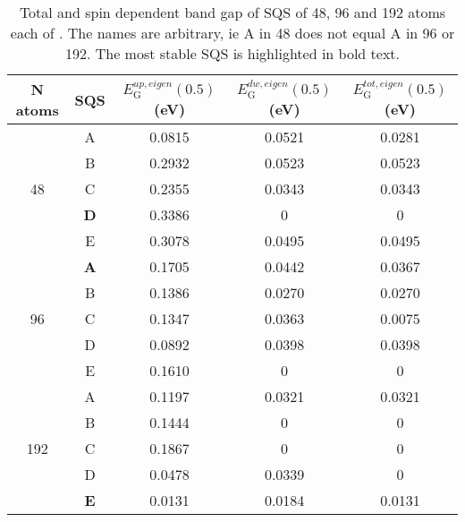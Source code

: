 \begin{table}[H]
\begin{tabular}{@{}ccccc@{}}
\toprule
N atoms                                   & SQS        & $E_\text{G} ^{up, eigen}(0.5)$ (eV) & $E_\text{G} ^{dw, eigen}(0.5)$ (eV) & $E_\text{G} ^{tot, eigen}(0.5)$ (eV) \\ \midrule
\multicolumn{1}{c|}{\multirow{5}{*}{48}}  & A          & 0.0815       & 0.0521         & 0.0281     \\
\multicolumn{1}{c|}{}                     & B          & 0.2932       & 0.0523         & 0.0523     \\
\multicolumn{1}{c|}{}                     & C          & 0.2355       & 0.0343         & 0.0343     \\
\multicolumn{1}{c|}{}                     & \textbf{D} & 0.3386       & 0              & 0          \\
\multicolumn{1}{c|}{}                     & E          & 0.3078       & 0.0495         & 0.0495     \\ \midrule
\multicolumn{1}{c|}{\multirow{5}{*}{96}}  & \textbf{A} & 0.1705       & 0.0442         & 0.0367     \\
\multicolumn{1}{c|}{}                     & B          & 0.1386       & 0.0270         & 0.0270     \\
\multicolumn{1}{c|}{}                     & C          & 0.1347       & 0.0363         & 0.0075     \\
\multicolumn{1}{c|}{}                     & D          & 0.0892       & 0.0398         & 0.0398     \\
\multicolumn{1}{c|}{}                     & E          & 0.1610       & 0              & 0          \\ \midrule
\multicolumn{1}{c|}{\multirow{5}{*}{192}} & A          & 0.1197       & 0.0321         & 0.0321     \\
\multicolumn{1}{c|}{}                     & B          & 0.1444       & 0              & 0          \\
\multicolumn{1}{c|}{}                     & C          & 0.1867       & 0              & 0          \\
\multicolumn{1}{c|}{}                     & D          & 0.0478       & 0.0339         & 0          \\
\multicolumn{1}{c|}{}                     & \textbf{E} & 0.0131       & 0.0184         & 0.0131     \\ \bottomrule
\end{tabular}
\caption{Total and spin dependent band gap of SQS of 48, 96 and 192 atoms each of . The names are arbitrary, ie A in 48 does not equal A in 96 or 192. The most stable SQS is highlighted in bold text.}
\end{table}

